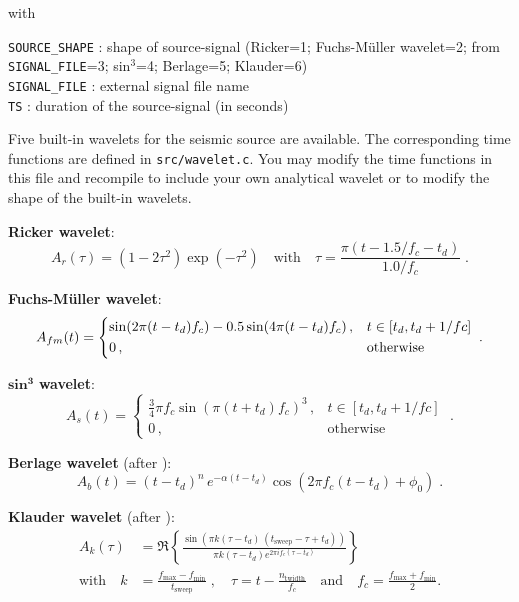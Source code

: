 with

\texttt{SOURCE\_SHAPE} : shape of source-signal (Ricker=1; Fuchs-M\"uller wavelet=2; from \texttt{SIGNAL\_FILE}=3; sin$^3$=4; Berlage=5; Klauder=6)\\
\texttt{SIGNAL\_FILE} : external signal file name\\
\texttt{TS} : duration of the source-signal (in seconds)

Five built-in wavelets for the seismic source are available. The corresponding time functions are defined in \texttt{src/wavelet.c}. You may modify the time functions in this file and recompile to include your own analytical wavelet or to modify the shape of the built-in wavelets.

\textbf{Ricker wavelet}:
\begin{equation}
    A_r(\tau)= \left(1-2\tau^2\right)\exp(- \tau^2) \quad \mbox{with} \quad \tau=\frac{\pi(t-1.5/f_c-t_d)}{1.0/f_c}\;. 
    \label{eq_ricker}
\end{equation}

\textbf{Fuchs-M\"uller wavelet}:
\begin{equation}
    A_{fm}(t) = \begin{dcases} \sin(2\pi(t-t_d)f_c)-0.5\sin(4\pi(t-t_d)f_c)\,, & t\in[t_d,t_d+1/fc] \\
                 0\,, & \text{otherwise} \end{dcases}\;.
    \label{eq_fm}
\end{equation}

$\mathbf{sin^3}$ \textbf{wavelet}:
\begin{equation}
    A_{s}(t)=\begin{cases} \frac{3}{4} \pi f_c \sin(\pi(t+t_d)f_c)^3\,, & t \in[t_d,t_d+1/fc]\\
           0\,, & \text{otherwise} \end{cases}\;.
\label{eq_s3}
\end{equation}

\textbf{Berlage wavelet} (after \cite{aldrige:90}):
\begin{equation}
    A_b(t)=(t-t_d)^n\,e^{-\alpha (t-t_d)} \cos(2 \pi f_c (t-t_d) + \phi_0)\;.
    \label{eq_berlage}
\end{equation}

\textbf{Klauder wavelet} (after \cite{neelima:18}):
\begin{equation}
\begin{split} A_k(\tau) &= \Re \left\{ \frac{\sin\left(\pi k(\tau-t_d)\,(t_\text{sweep}-\tau+t_d)\right)}{ \pi k (\tau-t_d) e^{2 \pi i f_c (\tau-t_d)} } \right\} \\
\mbox{with} \quad k &= \frac{f_\text{max}-f_\text{min}}{t_\text{sweep}}\;,\quad\tau = t-\frac{n_\text{twidth}}{f_c}\quad\text{and}\quad f_c=\frac{f_\text{max}+f_\text{min}}{2}.\end{split}
    \label{eq_klauder}
\end{equation}

